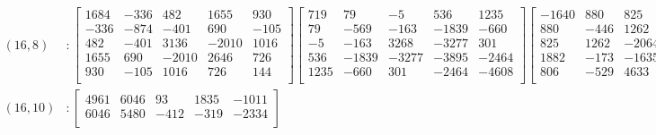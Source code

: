 \documentclass[12pt]{amsart}
\theoremstyle{plain}
\theoremstyle{definition}
\begin{document}
\begin{landscape}
\thispagestyle{empty}
\tiny
\begin{align*} 
(16,8) &:
\begin{bmatrix}
1684  &   -336  &   482  &   1655  &   930  \\ 
 -336  &   -874  &   -401  &   690  &   -105  \\ 
 482  &   -401  &   3136  &   -2010  &   1016  \\ 
 1655  &   690  &   -2010  &   2646  &   726  \\ 
 930  &   -105  &   1016  &   726  &   144  \\ 
\end{bmatrix}
\begin{bmatrix}
719  &   79  &   -5  &   536  &   1235  \\ 
 79  &   -569  &   -163  &   -1839  &   -660  \\ 
 -5  &   -163  &   3268  &   -3277  &   301  \\ 
 536  &   -1839  &   -3277  &   -3895  &   -2464  \\ 
 1235  &   -660  &   301  &   -2464  &   -4608  \\ 
\end{bmatrix}
\begin{bmatrix}
-1640  &   880  &   825  &   1882  &   806  \\ 
 880  &   -446  &   1262  &   -173  &   -529  \\ 
 825  &   1262  &   -2064  &   -1635  &   4633  \\ 
 1882  &   -173  &   -1635  &   2860  &   446  \\ 
 806  &   -529  &   4633  &   446  &   -2472  \\ 
\end{bmatrix}
\begin{bmatrix}
-2514  &   -120  &   -953  &   -1541  &   -945  \\ 
 -120  &   -12  &   -32  &   -104  &   -84  \\ 
 -953  &   -32  &   -3850  &   2126  &   -654  \\ 
 -1541  &   -104  &   2126  &   -3114  &   -478  \\ 
 -945  &   -84  &   -654  &   -478  &   -638  \\ 
\end{bmatrix}
\\
(16,10) &:
\begin{bmatrix}
4961  &   6046  &   93  &   1835  &   -1011  \\ 
 6046  &   5480  &   -412  &   -319  &   -2334  \\ 

\end{bmatrix}
\end{align*}
\end{landscape}
\end{document}
